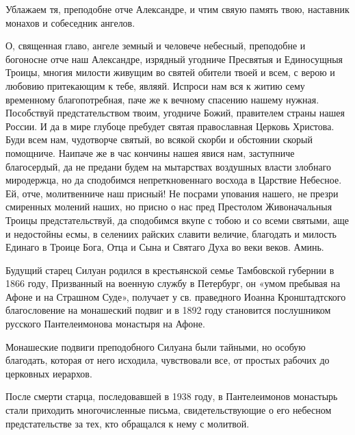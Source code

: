 

Ублажаем тя, преподобне отче Александре, и чтим свяую память твою, наставник монахов и собеседник ангелов.




О, священная главо, ангеле земный и человече небесный, преподобне и богоносне отче наш Александре, изрядный угодниче Пресвятыя и Единосущныя Троицы, многия милости живущим во святей обители твоей и всем, с верою и любовию притекающим к тебе, являяй. Испроси нам вся к житию сему временному благопотребная, паче же к вечному спасению нашему нужная. Пособствуй предстательством твоим, угодниче Божий, правителем страны нашея России. И да в мире глубоце пребудет святая православная Церковь Христова. Буди всем нам, чудотворче святый, во всякой скорби и обстоянии скорый помощниче. Наипаче же в час кончины нашея явися нам, заступниче благосердый, да не предани будем на мытарствах воздушных власти злобнаго миродержца, но да сподобимся непреткновеннаго восхода в Царствие Небесное. Ей, отче, молитвенниче наш присный! Не посрами упования нашего, не презри смиренных молений наших, но присно о нас пред Престолом Живоначальныя Троицы предстательствуй, да сподобимся вкупе с тобою и со всеми святыми, аще и недостойны есмы, в селениих райских славити величие, благодать и милость Единаго в Троице Бога, Отца и Сына и Святаго Духа во веки веков. Аминь.\mychapterending

 

Будущий старец Силуан родился в крестьянской семье Тамбовской губернии в 1866 году, Призванный на военную службу в Петербург, он «умом пребывая на Афоне и на Страшном Суде», получает у св. праведного Иоанна Кронштадтского благословение на монашеский подвиг и в 1892 году становится послушником русского Пантелеимонова монастыря на Афоне. 


Монашеские подвиги преподобного Силуана были тайными, но особую благодать, которая от него исходила, чувствовали все, от простых рабочих до церковных иерархов. 


После смерти старца, последовавшей в 1938 году, в Пантелеимонов монастырь стали приходить многочисленные письма, свидетельствующие о его небесном предстательстве за тех, кто обращался к нему с молитвой.




